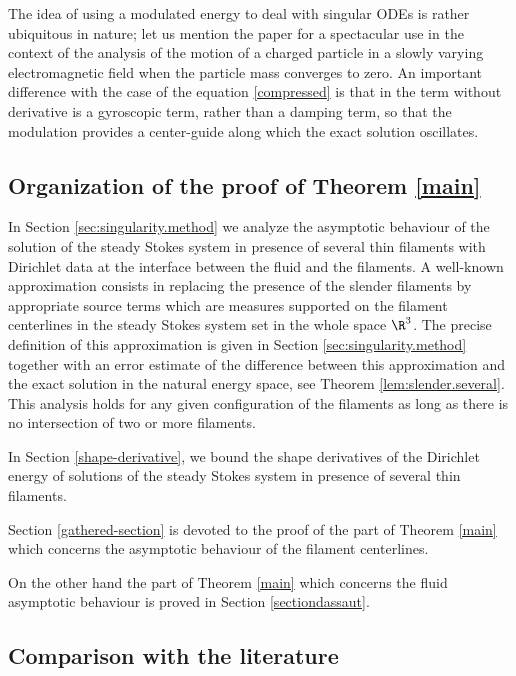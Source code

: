 \begin{remark} \label{rk-modu}
The idea of using a modulated energy to deal with singular ODEs is rather ubiquitous in nature; let us mention the paper \cite{BG} for a spectacular use in the context of the analysis of
the motion of a charged particle in a slowly varying electromagnetic field when the particle mass converges to zero. An important difference with the case of the equation \eqref{compressed} is that
in \cite{BG} the term without derivative is a gyroscopic term, rather than a damping term, so that the modulation provides a center-guide along which the exact solution oscillates.
\end{remark}

\subsection{Organization of the proof of Theorem \ref{main}}
\label{sec:structure}

In Section \ref{sec:singularity.method} we analyze the asymptotic behaviour of the solution of the steady Stokes system in presence of several thin filaments with Dirichlet data at the interface between the fluid and the filaments. A well-known approximation consists in replacing the presence of the slender filaments by appropriate source terms which are measures supported on the filament centerlines in the steady Stokes system set in the whole space $\R^3$. The precise definition of this approximation is given in Section \ref{sec:singularity.method} together with an error estimate of the difference between this approximation and the exact solution in the natural energy space, see Theorem \ref{lem:slender.several}. This analysis holds for any given configuration of the filaments as long as there is no intersection of two or more filaments.

In Section \ref{shape-derivative}, we bound the shape derivatives of the Dirichlet energy of solutions of the steady Stokes system in presence of several thin filaments.

Section \ref{gathered-section} is devoted to the proof of the part of Theorem \ref{main} which concerns the asymptotic behaviour of the filament centerlines.

On the other hand the part of Theorem \ref{main} which concerns the fluid
asymptotic behaviour is proved in Section \ref{sectiondassaut}.

\subsection{Comparison with the literature}
\label{compa-bib}

